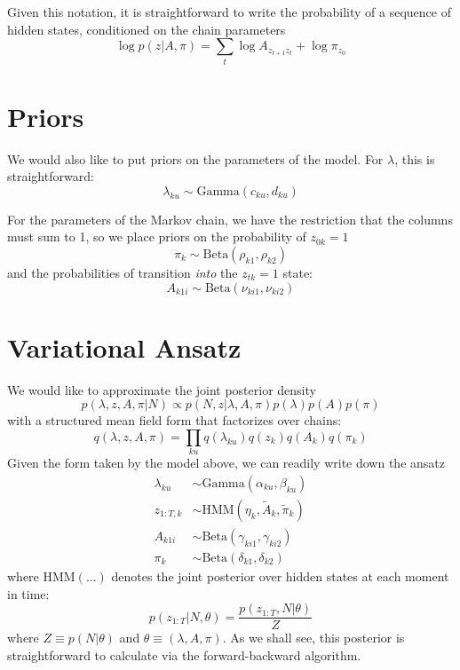 \documentclass[11pt]{article}
\begin{document}
Given this notation, it is straightforward to write the probability of a sequence of hidden states, conditioned on the chain parameters
\begin{equation}
    \log p(z|A, \pi) = \sum_t \log A_{z_{t+1} z_t} + \log \pi_{z_0}
\end{equation}

\section{Priors}
We would also like to put priors on the parameters of the model. For $\lambda$, this is straightforward:
\begin{equation}
    \lambda_{ku} \sim \mathrm{Gamma}(c_{ku}, d_{ku})
\end{equation}

For the parameters of the Markov chain, we have the restriction that the columns must sum to 1, so we place priors on the probability of $z_{0k} = 1$
\begin{equation}
    \pi_{k} \sim \mathrm{Beta}(\rho_{k1}, \rho_{k2})
\end{equation}
and the probabilities of transition \emph{into} the $z_{tk} = 1$ state:
\begin{equation}
    A_{k1i} \sim \mathrm{Beta}(\nu_{ki1}, \nu_{ki2})
\end{equation}

\section{Variational Ansatz}
We would like to approximate the joint posterior density
\begin{equation}
    p(\lambda, z, A, \pi|N) \propto p(N, z|\lambda, A, \pi) p(\lambda) p(A) p(\pi)
\end{equation}
with a structured mean field form that factorizes over chains:
\begin{equation}
     q(\lambda, z, A, \pi) = \prod_{ku} q(\lambda_{ku}) q(z_k) q(A_k) q(\pi_k)
\end{equation}
Given the form taken by the model above, we can readily write down the ansatz
\begin{align}
    \lambda_{ku} &\sim \mathrm{Gamma}(\alpha_{ku}, \beta_{ku}) \\
    z_{1:T, k} &\sim \mathrm{HMM}(\eta_k, \tilde{A}_k, \tilde{\pi}_k) \\
    A_{k1i} &\sim \mathrm{Beta}(\gamma_{ki1}, \gamma_{ki2}) \\
    \pi_k &\sim \mathrm{Beta}(\delta_{k1}, \delta_{k2})
\end{align}
where $\mathrm{HMM}(\ldots)$ denotes the joint posterior over hidden states at each moment in time:
\begin{equation}
    p(z_{1:T}|N, \theta) = \frac{p(z_{1:T}, N|\theta)}{Z}
\end{equation}
where $Z \equiv p(N|\theta)$ and $\theta \equiv (\lambda, A, \pi)$. As we shall see, this posterior is straightforward to calculate via the forward-backward algorithm.
\end{document}
